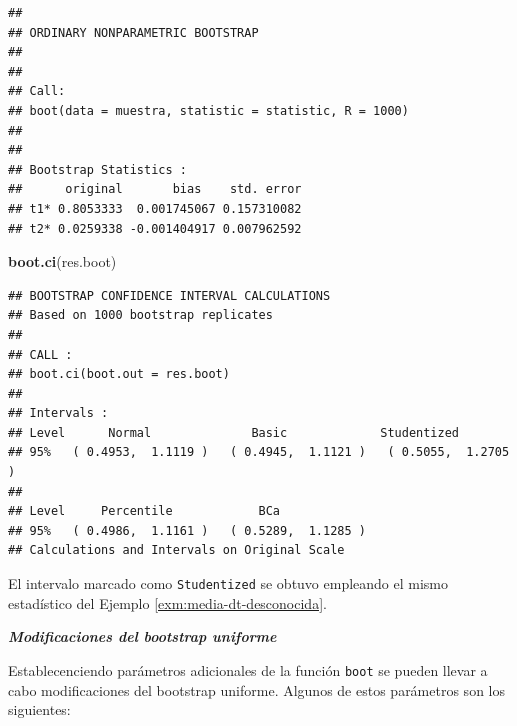 \documentclass[]{book}
\newenvironment{Shaded}{\begin{snugshade}}{\end{snugshade}}
\newcommand{\KeywordTok}[1]{\textcolor[rgb]{0.13,0.29,0.53}{\textbf{#1}}}
\newcommand{\NormalTok}[1]{#1}
\theoremstyle{definition}
\theoremstyle{definition}
\theoremstyle{definition}
\theoremstyle{remark}
\begin{document}
\begin{verbatim}
## 
## ORDINARY NONPARAMETRIC BOOTSTRAP
## 
## 
## Call:
## boot(data = muestra, statistic = statistic, R = 1000)
## 
## 
## Bootstrap Statistics :
##      original       bias    std. error
## t1* 0.8053333  0.001745067 0.157310082
## t2* 0.0259338 -0.001404917 0.007962592
\end{verbatim}

\begin{Shaded}
\begin{Highlighting}[]
\KeywordTok{boot.ci}\NormalTok{(res.boot)}
\end{Highlighting}
\end{Shaded}

\begin{verbatim}
## BOOTSTRAP CONFIDENCE INTERVAL CALCULATIONS
## Based on 1000 bootstrap replicates
## 
## CALL : 
## boot.ci(boot.out = res.boot)
## 
## Intervals : 
## Level      Normal              Basic             Studentized     
## 95%   ( 0.4953,  1.1119 )   ( 0.4945,  1.1121 )   ( 0.5055,  1.2705 )  
## 
## Level     Percentile            BCa          
## 95%   ( 0.4986,  1.1161 )   ( 0.5289,  1.1285 )  
## Calculations and Intervals on Original Scale
\end{verbatim}

El intervalo marcado como \texttt{Studentized} se obtuvo empleando el
mismo estadístico del Ejemplo \ref{exm:media-dt-desconocida}.

\textbf{\emph{Modificaciones del bootstrap uniforme}}

Establecenciendo parámetros adicionales de la función \texttt{boot} se
pueden llevar a cabo modificaciones del bootstrap uniforme. Algunos de
estos parámetros son los siguientes:
\end{document}
